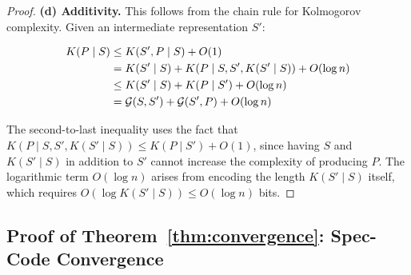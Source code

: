 \documentclass[11pt, a4paper, copyright]{googledeepmind}
\begin{document}
\begin{proof}
\textbf{(d) Additivity.} This follows from the chain rule for Kolmogorov complexity. Given an intermediate representation $S'$:

\begin{align}
K(P \mid S) &\leq K(S', P \mid S) + O(1) \notag \\
&= K(S' \mid S) + K(P \mid S, S', K(S' \mid S)) + O(\log n) \notag \\
&\leq K(S' \mid S) + K(P \mid S') + O(\log n) \notag \\
&= \mathcal{G}(S, S') + \mathcal{G}(S', P) + O(\log n)
\end{align}

The second-to-last inequality uses the fact that $K(P \mid S, S', K(S' \mid S)) \leq K(P \mid S') + O(1)$, since having $S$ and $K(S' \mid S)$ in addition to $S'$ cannot increase the complexity of producing $P$. The logarithmic term $O(\log n)$ arises from encoding the length $K(S' \mid S)$ itself, which requires $O(\log K(S' \mid S)) \leq O(\log n)$ bits.
\end{proof}


\subsection{Proof of Theorem~\ref{thm:convergence}: Spec-Code Convergence}
\end{document}
